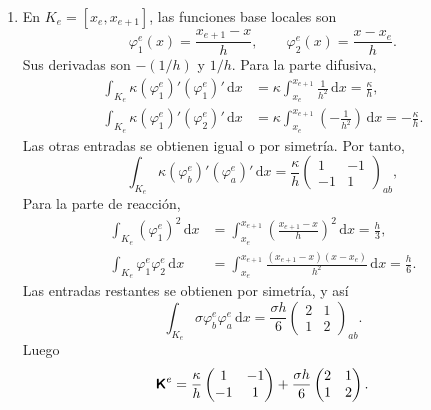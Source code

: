 \documentclass[11pt]{article}
\def\mat   #1{\mbox{\boldmath $\mathsf #1$}}
\def\dx{\mbox{\(\,\mathrm{d}x\)}}
\begin{document}
\begin{enumerate}[label=\textbf{\arabic*.}, leftmargin=*]
\begin{enumerate}[label=(\alph*)]
        \item En $K_e=[x_e,x_{e+1}]$, las funciones base locales son
        \[
            \varphi_1^e(x)=\frac{x_{e+1}-x}{h},
            \qquad
            \varphi_2^e(x)=\frac{x-x_e}{h}.
        \]
        Sus derivadas son $-(1/h)$ y $1/h$. Para la parte difusiva,
        \[
        \begin{aligned}
            \int_{K_e}\kappa(\varphi_1^e)'(\varphi_1^e)'\dx
            &=
            \kappa\int_{x_e}^{x_{e+1}}\frac{1}{h^2}\dx
            =
            \frac{\kappa}{h},\\
            \int_{K_e}\kappa(\varphi_1^e)'(\varphi_2^e)'\dx
            &=
            \kappa\int_{x_e}^{x_{e+1}}\left(-\frac{1}{h^2}\right)\dx
            =
            -\frac{\kappa}{h}.
        \end{aligned}
        \]
        Las otras entradas se obtienen igual o por simetría. Por tanto,
        \[
            \int_{K_e}\kappa(\varphi_b^e)'(\varphi_a^e)'\dx
            =
            \frac{\kappa}{h}
            \begin{pmatrix}
                1&-1\\
                -1&1
            \end{pmatrix}_{ab},
        \]
        Para la parte de reacción,
        \[
        \begin{aligned}
            \int_{K_e}(\varphi_1^e)^2\dx
            &=
            \int_{x_e}^{x_{e+1}}
            \left(\frac{x_{e+1}-x}{h}\right)^2\dx
            =
            \frac{h}{3},\\
            \int_{K_e}\varphi_1^e\varphi_2^e\dx
            &=
            \int_{x_e}^{x_{e+1}}
            \frac{(x_{e+1}-x)(x-x_e)}{h^2}\dx
            =
            \frac{h}{6}.
        \end{aligned}
        \]
        Las entradas restantes se obtienen por simetría, y así
        \[
            \int_{K_e}\sigma\varphi_b^e\varphi_a^e\dx
            =
            \frac{\sigma h}{6}
            \begin{pmatrix}
                2&1\\
                1&2
            \end{pmatrix}_{ab}.
        \]
        Luego
        \[
            \mat K^e=
            \frac{\kappa}{h}
            \begin{pmatrix}
                1&-1\\
                -1&1
            \end{pmatrix}
            +
            \frac{\sigma h}{6}
            \begin{pmatrix}
                2&1\\
                1&2
            \end{pmatrix}.
        \]


\end{enumerate}
\end{enumerate}
\end{document}
